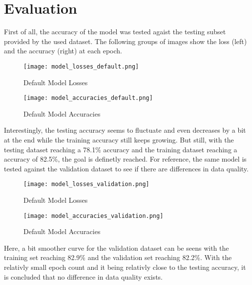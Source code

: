 \chapter{Evaluation}

First of all, the accuracy of the model was tested agaist the testing subset provided by the used dataset. The following groups of images show the loss (left) and
the accuracy (right) at each epoch.

\begin{figure}[H]
\centering
\begin{minipage}{.45\textwidth}
  \centering
  \texttt{[image: model\_losses\_default.png]}
  \caption{Default Model Losses}
\end{minipage}
\begin{minipage}{.45\textwidth}
  \centering
  \texttt{[image: model\_accuracies\_default.png]}
  \caption{Default Model Accuracies}
\end{minipage}
\end{figure}

Interestingly, the testing accuracy seems to fluctuate and even decreases by a bit at the end while the training accuracy still keeps growing. But still, with
the testing dataset reaching a 78.1\% accuracy and the training dataset reaching a accuracy of 82.5\%, the goal is definetly reached. For reference, the same model
is tested against the validation dataset to see if there are differences in data quality.

\begin{figure}[H]
\centering
\begin{minipage}{.45\textwidth}
  \centering
  \texttt{[image: model\_losses\_validation.png]}
  \caption{Default Model Losses}
\end{minipage}
\begin{minipage}{.45\textwidth}
  \centering
  \texttt{[image: model\_accuracies\_validation.png]}
  \caption{Default Model Accuracies}
\end{minipage}
\end{figure}

Here, a bit smoother curve for the validation dataset can be seens with the training set reaching 82.9\% and the validation set reaching 82.2\%. With the relativly small epoch
count and it being relativly close to the testing accuracy, it is concluded that no difference in data quality exists.